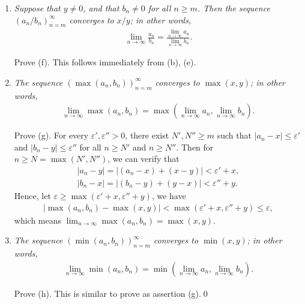 \documentclass{book}
\begin{document}
\begin{enumerate}
    \item \emph{Suppose that $y\neq 0$, and that $b_n\neq 0$ for all $n\geq m$. Then the sequence $(a_n/b_n)_{n=m}^\infty$ converges to $x/y$; in other words,}
    \begin{align*}
        \lim_{n\to\infty}\frac{a_n}{b_n}=\frac{\lim_{n\to\infty}a_n}{\lim_{n\to\infty}b_n}.
    \end{align*}

    Prove (f). This follows immediately from (b), (e).
    \begin{comment}
    Following (a), (b), we have
        \begin{align*}
            \left|\frac{a_n}{b_n}-\frac{x}{y}\right|=\left|\frac{ya_n-xb_n}{yb_n}\right|<\left|\frac{a_n(y-b_n)+b_n(a_n-x)}{y^2}\right|
        \end{align*}
    \end{comment}
    \item \emph{The sequence $(\max(a_n,b_n))_{n=m}^\infty$ converges to $\max(x,y)$; in other words,}
    \begin{align*}
        \lim_{n\to\infty}\max(a_n,b_n)=\max(\lim_{n\to\infty}a_n,\lim_{n\to\infty}b_n).
    \end{align*}

    Prove (g). For every $\varepsilon',\varepsilon''>0$, there exist $N',N''\geq m$ such that $|a_n-x|\leq\varepsilon'$ and $|b_n-y|\leq\varepsilon''$ for all $n\geq N'$ and $n\geq N''$. Then for $n\geq N=\max(N',N'')$, we can verify that
    \begin{align*}
        |a_n-y|=|(a_n-x)+(x-y)|<\varepsilon'+x,\\
        |b_n-x|=|(b_n-y)+(y-x)|<\varepsilon''+y.
    \end{align*}
    Hence, let $\varepsilon\geq \max(\varepsilon'+x,\varepsilon''+y)$, we have
    \begin{align*}
        |\max(a_n,b_n)-\max(x,y)|<\max(\varepsilon'+x,\varepsilon''+y)\leq\varepsilon,
    \end{align*}
    which means $\lim_{n\to\infty}\max(a_n,b_n)=\max(x,y)$.

    \item \emph{The sequence $(\min(a_n,b_n))_{n=m}^\infty$ converges to $\min(x,y)$; in other words,}
    \begin{align*}
        \lim_{n\to\infty}\min(a_n,b_n)=\min(\lim_{n\to\infty}a_n,\lim_{n\to\infty}b_n).
    \end{align*}

    Prove (h). This is similar to prove as assertion (g).\qed
\end{enumerate}
\end{document}
